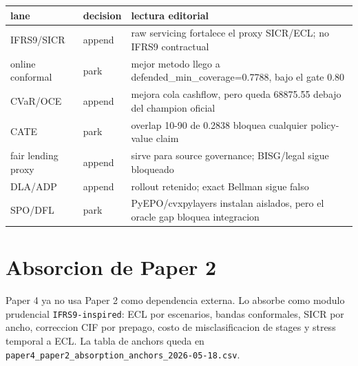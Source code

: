 \documentclass[
  spanish,
  11pt,
  letterpaper,
]{scrbook}
\newcounter{none} %
\theoremstyle{plain}
\theoremstyle{remark}
\begin{document}
{\def\LTcaptype{none} %
\begin{longtable}[]{@{}
  >{\raggedright\arraybackslash}p{}
  >{\raggedright\arraybackslash}p{}
  >{\raggedright\arraybackslash}p{}@{}}
\toprule\noalign{}
\begin{minipage}[b]{\linewidth}\raggedright
lane
\end{minipage} & \begin{minipage}[b]{\linewidth}\raggedright
decision
\end{minipage} & \begin{minipage}[b]{\linewidth}\raggedright
lectura editorial
\end{minipage} \\
\midrule\noalign{}
\endhead
\bottomrule\noalign{}
\endlastfoot
IFRS9/SICR & append & raw servicing fortalece el proxy SICR/ECL; no
IFRS9 contractual \\
online conformal & park & mejor metodo llego a
defended\_min\_coverage=0.7788, bajo el gate 0.80 \\
CVaR/OCE & append & mejora cola cashflow, pero queda 68875.55 debajo del
champion oficial \\
CATE & park & overlap 10-90 de 0.2838 bloquea cualquier policy-value
claim \\
fair lending proxy & append & sirve para source governance; BISG/legal
sigue bloqueado \\
DLA/ADP & append & rollout retenido; exact Bellman sigue falso \\
SPO/DFL & park & PyEPO/cvxpylayers instalan aislados, pero el oracle gap
bloquea integracion \\
\end{longtable}
}

\section{Absorcion de Paper 2}\label{absorcion-de-paper-2}

Paper 4 ya no usa Paper 2 como dependencia externa. Lo absorbe como
modulo prudencial \texttt{IFRS9-inspired}: ECL por escenarios, bandas
conformales, SICR por ancho, correccion CIF por prepago, costo de
misclasificacion de stages y stress temporal a ECL. La tabla de anchors
queda en \texttt{paper4\_paper2\_absorption\_anchors\_2026-05-18.csv}.
\end{document}
